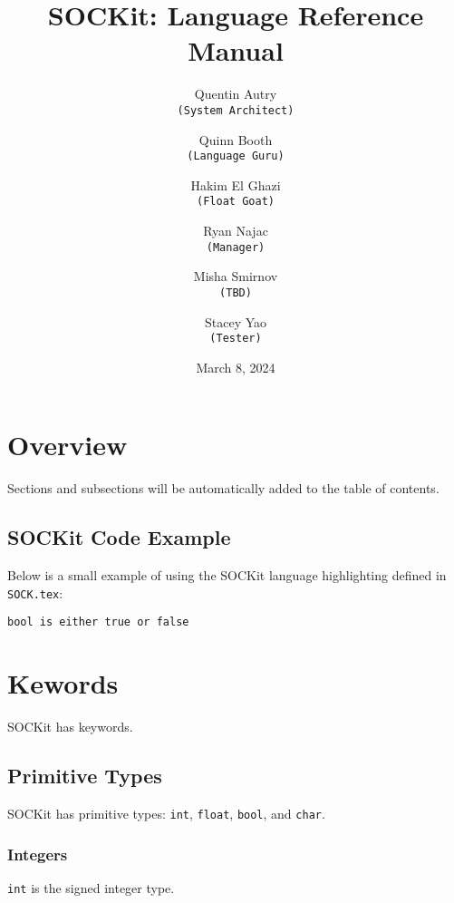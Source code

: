 \documentclass[12pt,a4paper]{article}
\title{SOCKit: Language Reference Manual}
\author{
    Quentin Autry\\
        \texttt{(System Architect)} \and
    Quinn Booth\\
        \texttt{(Language Guru)} \and
    Hakim El Ghazi\\
        \texttt{(Float Goat)} \and
    Ryan Najac\\
        \texttt{(Manager)} \and
    Misha Smirnov\\
        \texttt{(TBD)} \and
    Stacey Yao\\
        \texttt{(Tester)}
}
\date{March 8, 2024}
\begin{document}
\maketitle
\newpage
\tableofcontents
\newpage

\section{Overview}
Sections and subsections will be automatically added to the table of contents.

\subsection{SOCKit Code Example}
Below is a small example of using the SOCKit language highlighting defined in \texttt{SOCK.tex}:

\begin{lstlisting}[language=SOCKit]
bool is either true or false
\end{lstlisting}

\section{Kewords}
SOCKit has keywords.

\subsection{Primitive Types}
SOCKit has primitive types: \texttt{int}, \texttt{float}, \texttt{bool}, and \texttt{char}.

\subsubsection{Integers}
\texttt{int} is the signed integer type.
\end{document}
